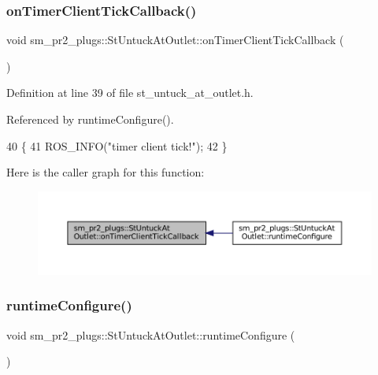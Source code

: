 \subsubsection{\texorpdfstring{on\+Timer\+Client\+Tick\+Callback()}{onTimerClientTickCallback()}}
{\footnotesize\ttfamily void sm\+\_\+pr2\+\_\+plugs\+::\+St\+Untuck\+At\+Outlet\+::on\+Timer\+Client\+Tick\+Callback (\begin{DoxyParamCaption}{ }\end{DoxyParamCaption})\hspace{0.3cm}{\ttfamily [inline]}}



Definition at line 39 of file st\+\_\+untuck\+\_\+at\+\_\+outlet.\+h.



Referenced by runtime\+Configure().


\begin{DoxyCode}
40     \{
41         ROS\_INFO(\textcolor{stringliteral}{"timer client tick!"});
42     \}
\end{DoxyCode}
Here is the caller graph for this function\+:
\nopagebreak
\begin{figure}[H]
\begin{center}
\leavevmode
\includegraphics[width=350pt]{structsm__pr2__plugs_1_1StUntuckAtOutlet_a51a908bc8b1908d8e548db64bc8a5528_icgraph}
\end{center}
\end{figure}
\mbox{\label{structsm__pr2__plugs_1_1StUntuckAtOutlet_a14d6ec782f8d78b6df0ef610508b0e9b}} 
\subsubsection{\texorpdfstring{runtime\+Configure()}{runtimeConfigure()}}
{\footnotesize\ttfamily void sm\+\_\+pr2\+\_\+plugs\+::\+St\+Untuck\+At\+Outlet\+::runtime\+Configure (\begin{DoxyParamCaption}{ }\end{DoxyParamCaption})\hspace{0.3cm}{\ttfamily [inline]}}



